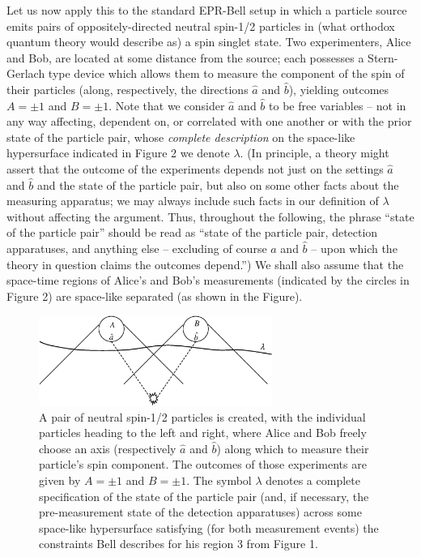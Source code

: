 \documentclass[aps,prc,onecolumn,12pt,nofootinbib]{revtex4-2}
\begin{document}
Let us now apply this to the standard EPR-Bell setup
in which a particle source emits
pairs of oppositely-directed neutral spin-1/2 particles in (what
orthodox quantum theory would describe as) a spin singlet state.  Two
experimenters, Alice and Bob, are located at some distance from the
source; each possesses a Stern-Gerlach type device which allows them
to measure the component of the spin of their particles (along,
respectively, the directions $\hat{a}$ and $\hat{b}$), yielding
outcomes $A = \pm 1$ and $B= \pm 1$.  Note that we consider $\hat{a}$
and $\hat{b}$ to be free variables -- not in any way affecting,
dependent on, or
correlated with one another or with the prior state of the
particle pair, whose \emph{complete description} on the space-like
hypersurface indicated in Figure 2 we denote $\lambda$.  (In
principle, a theory might assert that the outcome of the experiments
depends not just on the settings $\hat{a}$ and $\hat{b}$ and the state
of the particle pair, but also on some other facts about the measuring
apparatus; we may always include such facts in our definition of
$\lambda$ without affecting the argument.  Thus, throughout the
following, the phrase ``state of the particle pair'' should be read as
``state of the particle pair, detection apparatuses, and anything else
-- excluding of course $\hat{a}$ and $\hat{b}$ --
upon which the theory in question claims the outcomes depend.'')
We shall also assume that the space-time regions of Alice's and Bob's
measurements (indicated by the circles in Figure 2) are space-like
separated (as shown in the Figure).

\begin{figure}
\begin{center}
\includegraphics[width=3.0in,clip]{./eprsetup.eps}
\end{center}
\caption{
\label{fig2}
A pair of neutral spin-1/2 particles
is created, with the individual particles heading
to the left and right, where Alice and Bob freely choose an axis
(respectively $\hat{a}$ and $\hat{b}$) along which to measure their
particle's spin component.  The outcomes of those experiments are
given by $A = \pm 1$ and $B = \pm 1$.  The symbol $\lambda$ denotes a
complete specification of the state of the particle pair (and, if
necessary, the pre-measurement state of the detection apparatuses) across
some space-like hypersurface satisfying (for both measurement events)
the constraints Bell describes for his region 3 from Figure 1.
}
\end{figure}
\end{document}
